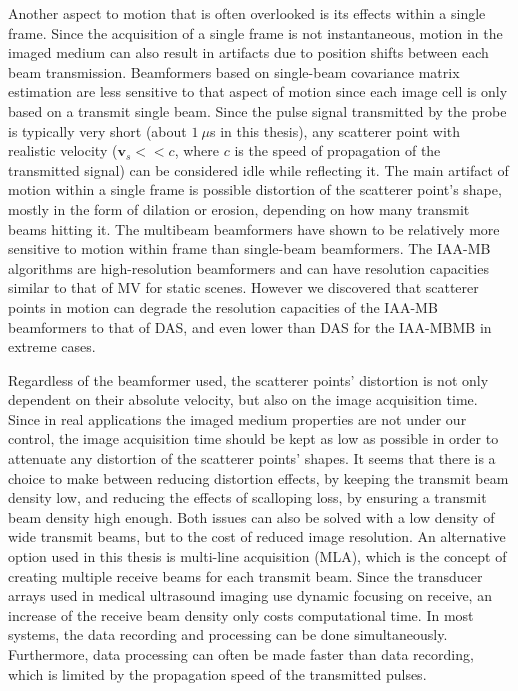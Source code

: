 Another aspect to motion that is often overlooked is its effects within a single frame.
Since the acquisition of a single frame is not instantaneous, motion in the imaged medium can also result in artifacts due to position shifts between each beam transmission.
Beamformers based on single-beam covariance matrix estimation are less sensitive to that aspect of motion since each image cell is only based on a transmit single beam.
Since the pulse signal transmitted by the probe is typically very short (about $1~\mu$s in this thesis), any scatterer point with realistic velocity ($\boldsymbol{v}_s << c$, where $c$ is the speed of propagation of the transmitted signal) can be considered idle while reflecting it.
The main artifact of motion within a single frame is possible distortion of the scatterer point's shape, mostly in the form of dilation or erosion, depending on how many transmit beams hitting it.
The multibeam beamformers have shown to be relatively more sensitive to motion within frame than single-beam beamformers.
The IAA-MB algorithms are high-resolution beamformers and can have resolution capacities similar to that of MV for static scenes.
However we discovered that scatterer points in motion can degrade the resolution capacities of the IAA-MB beamformers to that of DAS, and even lower than DAS for the IAA-MBMB in extreme cases.

Regardless of the beamformer used, the scatterer points' distortion is not only dependent on their absolute velocity, but also on the image acquisition time.
Since in real applications the imaged medium properties are not under our control, the image acquisition time should be kept as low as possible in order to attenuate any distortion of the scatterer points' shapes.
It seems that there is a choice to make between reducing distortion effects, by keeping the transmit beam density low, and reducing the effects of scalloping loss, by ensuring a transmit beam density high enough. Both issues can also be solved with a low density of wide transmit beams, but to the cost of reduced image resolution.
An alternative option used in this thesis is multi-line acquisition (MLA), which is the concept of creating multiple receive beams for each transmit beam.
Since the transducer arrays used in medical ultrasound imaging use dynamic focusing on receive, an increase of the receive beam density only costs computational time.
In most systems, the data recording and processing can be done simultaneously. Furthermore, data processing can often be made faster than data recording, which is limited by the propagation speed of the transmitted pulses.

